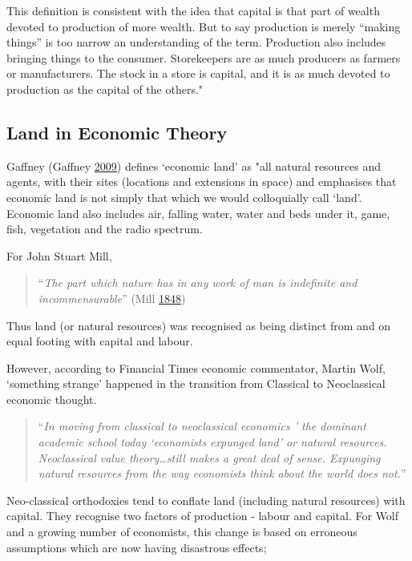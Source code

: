 \documentclass[]{tufte-handout}
\begin{document}
This definition is consistent with the idea that capital is that part of
wealth devoted to production of more wealth. But to say production is
merely ``making things'' is too narrow an understanding of the term.
Production also includes bringing things to the consumer. Storekeepers
are as much producers as farmers or manufacturers. The stock in a store
is capital, and it is as much devoted to production as the capital of
the others."

\hypertarget{land-in-economic-theory}{%
\subsection{Land in Economic Theory}\label{land-in-economic-theory}}

Gaffney (Gaffney \protect\hyperlink{ref-Gaffney2009}{2009}) defines
`economic land' as "all natural resources and agents, with their sites
(locations and extensions in space) and emphasises that economic land is
not simply that which we would colloquially call `land'. Economic land
also includes air, falling water, water and beds under it, game, fish,
vegetation and the radio spectrum.

For John Stuart Mill,

\begin{quote}
``\emph{The part which nature has in any work of man is indefinite and
incommensurable}'' (Mill
\protect\hyperlink{ref-mill1848principles}{1848})
\end{quote}

Thus land (or natural resources) was recognised as being distinct from
and on equal footing with capital and labour.

However, according to Financial Times economic commentator, Martin Wolf,
`something strange' happened in the transition from Classical to
Neoclassical economic thought.

\begin{quote}
``\emph{In moving from classical to neoclassical economics ' the
dominant academic school today `economists expunged land' or natural
resources. Neoclassical value theory\ldots{}still makes a great deal of
sense. Expunging natural resources from the way economists think about
the world does not.}''
\end{quote}

Neo-classical orthodoxies tend to conflate land (including natural
resources) with capital. They recognise two factors of production -
labour and capital. For Wolf and a growing number of economists, this
change is based on erroneous assumptions which are now having disastrous
effects;
\end{document}
